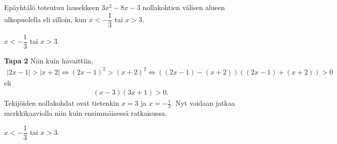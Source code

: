 \begin{esimerkki}
\begin{esimratk}
Epäyhtälö toteutuu lausekkeen $3x^2-8x-3$ nollakohtien välisen alueen ulkopuolella eli silloin, kun $x<-\dfrac{1}{3}$ tai $x>3$.
\end{esimratk}

\begin{esimvast}
$x<-\dfrac{1}{3}$ tai $x>3$.
\end{esimvast}

\begin{esimratk} \textbf{Tapa 2}
Niin kuin havaittiin,
\begin{align*}
|2x-1| > |x+2| \Leftrightarrow (2x-1)^2 > (x+2)^2 \Leftrightarrow ((2x-1)-(x+2))((2x-1)+(x+2)) > 0
\end{align*}
eli
\begin{align*}
(x-3)(3x+1)>0.
\end{align*}
Tekijöiden nollakohdat ovat tietenkin $x = 3$ ja $x = -\frac{1}{3}$. Nyt voidaan jatkaa merkkikaaviolla niin kuin ensimmäisessä ratkaisussa.
\end{esimratk}
\begin{esimvast}
$x<-\dfrac{1}{3}$ tai $x>3$.
\end{esimvast}
\end{esimerkki}

